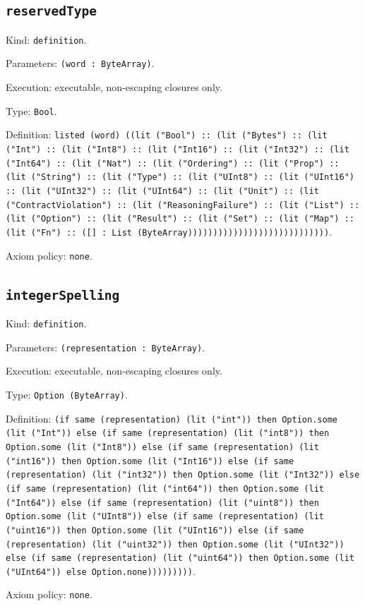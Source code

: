 \documentclass[11pt]{article}
\begin{document}
\subsection*{\texttt{reservedType}}
\noindent Kind: \texttt{definition}.\par
\noindent Parameters: \texttt{(word : ByteArray)}.\par
\noindent Execution: executable, non-escaping closures only.\par
\noindent Type: \texttt{Bool}.\par
\noindent Definition: \texttt{listed (word) ((lit ("Bool") :: (lit ("Bytes") :: (lit ("Int") :: (lit ("Int8") :: (lit ("Int16") :: (lit ("Int32") :: (lit ("Int64") :: (lit ("Nat") :: (lit ("Ordering") :: (lit ("Prop") :: (lit ("String") :: (lit ("Type") :: (lit ("UInt8") :: (lit ("UInt16") :: (lit ("UInt32") :: (lit ("UInt64") :: (lit ("Unit") :: (lit ("ContractViolation") :: (lit ("ReasoningFailure") :: (lit ("List") :: (lit ("Option") :: (lit ("Result") :: (lit ("Set") :: (lit ("Map") :: (lit ("Fn") :: ([] : List (ByteArray))))))))))))))))))))))))))))}.\par
\noindent Axiom policy: \texttt{none}.\par
\subsection*{\texttt{integerSpelling}}
\noindent Kind: \texttt{definition}.\par
\noindent Parameters: \texttt{(representation : ByteArray)}.\par
\noindent Execution: executable, non-escaping closures only.\par
\noindent Type: \texttt{Option (ByteArray)}.\par
\noindent Definition: \texttt{(if same (representation) (lit ("int")) then Option.some (lit ("Int")) else (if same (representation) (lit ("int8")) then Option.some (lit ("Int8")) else (if same (representation) (lit ("int16")) then Option.some (lit ("Int16")) else (if same (representation) (lit ("int32")) then Option.some (lit ("Int32")) else (if same (representation) (lit ("int64")) then Option.some (lit ("Int64")) else (if same (representation) (lit ("uint8")) then Option.some (lit ("UInt8")) else (if same (representation) (lit ("uint16")) then Option.some (lit ("UInt16")) else (if same (representation) (lit ("uint32")) then Option.some (lit ("UInt32")) else (if same (representation) (lit ("uint64")) then Option.some (lit ("UInt64")) else Option.none)))))))))}.\par
\noindent Axiom policy: \texttt{none}.\par
\end{document}
